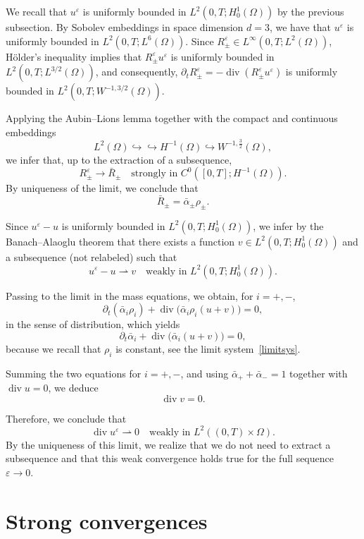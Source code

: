 \documentclass[11pt, twoside, a4paper]{article}
\theoremstyle{plain}
\theoremstyle{remark}
\numberwithin{equation}{section}
\renewcommand{\div}{\operatorname{div}}
\newcommand{\eps}{\varepsilon}
\begin{document}
We recall that $u^\varepsilon$ is uniformly bounded in $L^2(0,T;H^1_0(\Omega))$ by the previous subsection. 
By Sobolev embeddings in space dimension $d=3$, we have that $u^\eps$ is uniformly bounded in $L^2(0,T;L^6(\Omega))$. 
Since $R_\pm^\varepsilon \in L^\infty(0,T;L^2(\Omega))$, Hölder's inequality implies that $R_\pm^\varepsilon u^\varepsilon$ is uniformly bounded in $L^2(0,T;L^{3/2}(\Omega))$, and consequently, $\partial_t R_\pm^\varepsilon =-\div (R_\pm^\varepsilon u^\varepsilon)$ is uniformly bounded in $L^2(0,T;W^{-1,3/2}(\Omega))$.

Applying the Aubin--Lions lemma together with the compact and continuous embeddings
\[
L^2(\Omega) \hookrightarrow\hookrightarrow H^{-1}(\Omega)
\hookrightarrow W^{-1,\frac{3}{2}}(\Omega),
\]
we infer that, up to the extraction of a subsequence,
\[
R_\pm^\varepsilon \to \bar{R}_\pm
\quad \text{strongly in } C^0([0,T];H^{-1}(\Omega)).
\]
By uniqueness of the limit, we conclude that
\[
\bar{R}_\pm = \bar{\alpha}_\pm \rho_\pm.
\]

Since $u^\eps-u $ is uniformly bounded in $L^2(0,T;H^1_0(\Omega))$, we infer by the Banach–Alaoglu theorem that there exists a function 
$v \in L^2(0,T;H^1_0(\Omega))$ and a subsequence (not relabeled) such that
\[
u^\varepsilon - u \rightharpoonup v
\quad \text{weakly in } L^2(0,T;H^1_0(\Omega)).
\]

Passing to the limit in the mass equations, we obtain, for $i=+,-$,
\[
\partial_t (\bar{\alpha}_i \rho_i) + \operatorname{div}\big( \bar{\alpha}_i \rho_i (u+v) \big) = 0,
\]
in the sense of distribution,
which yields
\[
\partial_t \bar{\alpha}_i + \operatorname{div}\big( \bar{\alpha}_i (u+v) \big) = 0,
\]
because we recall that $\rho_i$ is constant, see the limit system~\eqref{limitsys}.

Summing the two equations for $i=+,-$, and using $\bar{\alpha}_+ + \bar{\alpha}_- = 1$ together with $\operatorname{div} u = 0$, we deduce
\[
\operatorname{div} v = 0.
\]

Therefore, we conclude that
\begin{equation*}
\operatorname{div} u^\varepsilon \rightharpoonup 0 \quad \text{weakly in } L^2((0,T)\times\Omega).
\end{equation*}
By the uniqueness of this limit, we realize that we do not need to extract a subsequence and that this weak convergence holds true for the full sequence $\eps\to 0$. 




\section{Strong convergences}\label{End}
\end{document}
